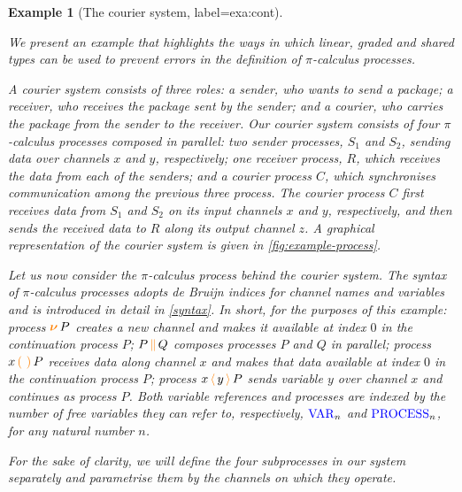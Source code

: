 \documentclass[sigplan,10pt,anonymous,review]{acmart}
\newtheorem{example}{Example}
\theoremstyle{definition}
\newcommand{\picalc}{$\pi$-calculus}
\newcommand{\type}[1]{\textcolor{blue}{\operatorname{#1}}}
\newcommand{\constr}[1]{\textcolor{orange}{\operatorname{#1}}}
\newcommand{\func}[1]{\textcolor{olive}{\operatorname{#1}}}
\newcommand{\comp}[2]{#1 \, \constr{\parallel} \, #2}
\newcommand{\new}{\constr{\boldsymbol{\nu}} \,}
\newcommand{\send}[2]{#1 \, \constr{\langle} \, #2 \,\constr{\rangle} \,}
\newcommand{\recv}[2]{#1 \, \constr{\mathbb{(}} \, #2 \, \constr{\mathbb{)}} \,}
\newcommand{\Var}{\type{VAR}}
\newcommand{\Process}{\type{PROCESS}}
\begin{document}
\begin{example}[The courier system, label=exa:cont]
\label{example-process}

We present an example that highlights the ways in which linear, graded and shared types can be used to prevent errors in the definition of \picalc{} processes.

A courier system consists of three roles: a sender, who wants to send a package; a receiver, who receives the package sent by the sender; and a courier, who carries the package from the sender to the receiver.
Our courier system consists of four \picalc{} processes composed in parallel:
two sender processes, $S_1$ and $S_2$, sending data over channels $x$ and $y$, respectively;
one receiver process, $R$, which receives the data from each of the senders;
and a courier process $C$, which synchronises communication among the previous three process.
The courier process $C$ first receives data from $S_1$ and $S_2$ on its input channels $x$ and $y$, respectively, and then sends the received data to $R$ along its output channel $z$.
A graphical representation of the courier system is given in \autoref{fig:example-process}.

Let us now consider the $\pi$-calculus process behind the courier system.
The syntax of \picalc{} processes adopts de Bruijn indices \cite{deBruijn1972} for channel names and variables and is introduced in detail in \autoref{syntax}.
In short, for the purposes of this example:
process $\new{} P$ creates a new channel and makes it available at index $0$ in the continuation process $P$;
$\comp{P}{Q}$ composes processes $P$ and $Q$ in parallel; process $\recv{x}{}P$ receives data along channel $x$ and makes that data available at index $0$ in the continuation process $P$;
process $\send{x}{y}{P}$ sends variable $y$ over channel $x$ and continues as process $P$.
Both variable references and processes are indexed by the number of free variables they can refer to, respectively, $\Var_n$ and $\Process_n$, for any natural number $n$.

For the sake of clarity, we will define the four subprocesses in our system separately and parametrise them by the channels on which they operate.

\begin{figure}[t]
  \small
  \centering
\end{figure}
\end{example}
\end{document}
